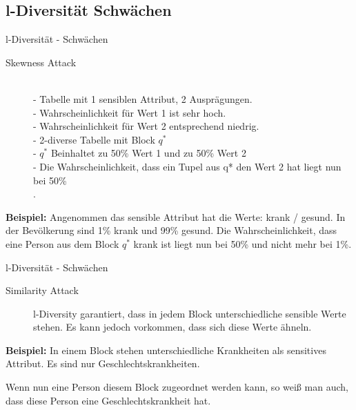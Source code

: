 \subsection{l-Diversität Schwächen}

\begin{frame}{l-Diversität - Schwächen}

\begin{description}
	\item[Skewness Attack] \ \\
    - Tabelle mit 1 sensiblen Attribut, 2 Ausprägungen.\\
    - Wahrscheinlichkeit für Wert 1 ist sehr hoch.\\
    - Wahrscheinlichkeit für Wert 2 entsprechend niedrig.\\
    - 2-diverse Tabelle mit Block $q^*$\\
    - $q^*$ Beinhaltet zu 50\% Wert 1 und zu 50\%  Wert 2\\
    - Die Wahrscheinlichkeit, dass ein Tupel aus q* den Wert 2 hat liegt nun bei 50\%  \\
    \tiny \cite{Li2007t-closseness}. 
\end{description}
\vspace{0.5cm}

\textbf{Beispiel:} Angenommen das sensible Attribut hat die Werte: krank / gesund. In der Bevölkerung sind 1\% krank und 99\% gesund. Die Wahrscheinlichkeit, dass eine Person aus dem Block $q^*$ krank ist liegt nun bei 50\% und nicht mehr bei 1\%.
\end{frame}

\begin{frame}{l-Diversität - Schwächen}
\begin{description}	
	\item[Similarity Attack] l-Diversity garantiert, dass in jedem Block unterschiedliche sensible Werte stehen. Es kann jedoch vorkommen, dass sich diese Werte ähneln. \\
    \tiny \cite{Li2007t-closseness} 
\end{description}

\vspace{1.5cm}

\normalsize
\textbf{Beispiel:} In einem Block stehen unterschiedliche Krankheiten als sensitives Attribut. Es sind nur Geschlechtskrankheiten.

Wenn nun eine Person diesem Block zugeordnet werden kann, so weiß man auch, dass diese Person eine Geschlechtskrankheit hat.

\end{frame}
